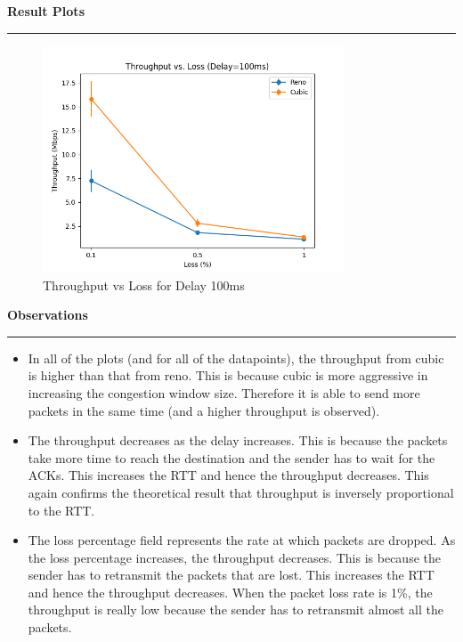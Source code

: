 \documentclass[a4paper,12pt]{article}
\newenvironment{solution}[2][]{%
    \begin{mdframed}[linecolor=blue!70!black, linewidth=2pt, roundcorner=10pt, backgroundcolor=yellow!10!white, skipabove=12pt, skipbelow=12pt]%
        \textbf{\large #2}
        \par\noindent\rule{\textwidth}{0.4pt}
}{
    \end{mdframed}
}
\begin{document}
\begin{solution}{Result Plots}
    \begin{figure}[H]
        \centering
        \includegraphics[width=0.8\textwidth]{throughput_vs_loss_delay_100ms.png}
        \caption{Throughput vs Loss for Delay 100ms}
    \end{figure}
\end{solution}

\begin{solution}{Observations}
    \begin{itemize}
        \item In all of the plots (and for all of the datapoints), the throughput from cubic is higher than that from reno. This is because cubic is more aggressive in increasing the congestion window size. Therefore it is able to send more packets in the same time (and a higher throughput is observed).
        \item The throughput decreases as the delay increases. This is because the packets take more time to reach the destination and the sender has to wait for the ACKs. This increases the RTT and hence the throughput decreases. This again confirms the theoretical result that throughput is inversely proportional to the RTT.
        \item The loss percentage field represents the rate at which packets are dropped. As the loss percentage increases, the throughput decreases. This is because the sender has to retransmit the packets that are lost. This increases the RTT and hence the throughput decreases. When the packet loss rate is 1\%, the throughput is really low because the sender has to retransmit almost all the packets.
    \end{itemize}
\end{solution}

\clearpage
\end{document}
